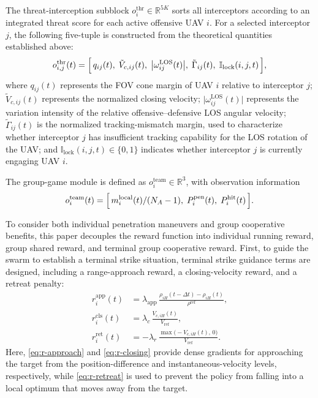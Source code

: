 \documentclass{cja}
\begin{document}
The threat-interception subblock $o_i^{\mathrm{thr}}\in\mathbb{R}^{5K}$ sorts all interceptors according to an integrated threat score for each active offensive UAV $i$. For a selected interceptor $j$, the following five-tuple is constructed from the theoretical quantities established above:
\begin{equation}
o_{i,j}^{\mathrm{thr}}(t)=
\Bigl[\,
q_{ij}(t),\;
\tilde V_{c,ij}(t),\;
\bigl|\omega_{ij}^{\mathrm{LOS}}(t)\bigr|,\;
\tilde\Gamma_{ij}(t),\;
\mathbb{I}_{\mathrm{lock}}(i,j,t)
\,\Bigr],
\label{eq:obs-thr}
\end{equation}
where $q_{ij}(t)$ represents the FOV cone margin of UAV $i$ relative to interceptor $j$; $\tilde V_{c,ij}(t)$ represents the normalized closing velocity; $\bigl|\omega_{ij}^{\mathrm{LOS}}(t)\bigr|$ represents the variation intensity of the relative offensive--defensive LOS angular velocity; $\tilde\Gamma_{ij}(t)$ is the normalized tracking-mismatch margin, used to characterize whether interceptor $j$ has insufficient tracking capability for the LOS rotation of the UAV; and $\mathbb{I}_{\mathrm{lock}}(i,j,t)\in\{0,1\}$ indicates whether interceptor $j$ is currently engaging UAV $i$.

The group-game module is defined as $o_i^{\mathrm{team}}\in\mathbb{R}^{3}$, with observation information
\begin{equation}
o_i^{\mathrm{team}}(t)=\Bigl[\,m_i^{\mathrm{local}}(t)/(N_A-1),\;P_i^{\mathrm{pen}}(t),\;P_i^{\mathrm{hit}}(t)\,\Bigr].
\label{eq:obs-team}
\end{equation}

To consider both individual penetration maneuvers and group cooperative benefits, this paper decouples the reward function into individual running reward, group shared reward, and terminal group cooperative reward.
First, to guide the swarm to establish a terminal strike situation, terminal strike guidance terms are designed, including a range-approach reward, a closing-velocity reward, and a retreat penalty:
\begin{align}
r_i^{\mathrm{app}}(t)&=\lambda_{\mathrm{app}}\,\frac{\rho_{iH}(t-\Delta t)-\rho_{iH}(t)}{\rho^{\mathrm{ref}}},
\label{eq:r-approach}\\
r_i^{\mathrm{cls}}(t)&=\lambda_{c}\,\frac{V_{c,iH}(t)}{V_{\mathrm{ref}}},
\label{eq:r-closing}\\
r_i^{\mathrm{ret}}(t)&=-\lambda_r\,\frac{\max\bigl(-V_{c,iH}(t),\,0\bigr)}{V_{\mathrm{ref}}}.
\label{eq:r-retreat}
\end{align}
Here, \eqref{eq:r-approach} and \eqref{eq:r-closing} provide dense gradients for approaching the target from the position-difference and instantaneous-velocity levels, respectively, while \eqref{eq:r-retreat} is used to prevent the policy from falling into a local optimum that moves away from the target.
\end{document}
